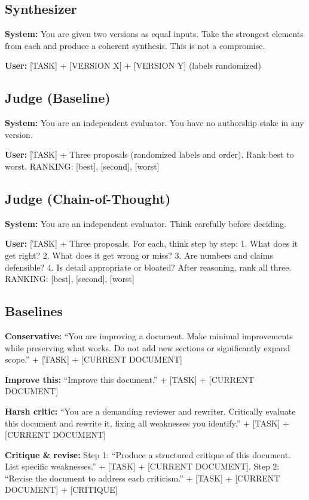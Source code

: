 \documentclass[11pt]{article}
\begin{document}
\subsection{Synthesizer}
\begin{tcolorbox}[promptbox]
\textbf{System:} You are given two versions as equal inputs. Take the strongest elements from each and produce a coherent synthesis. This is not a compromise.

\textbf{User:} [TASK] + [VERSION X] + [VERSION Y] (labels randomized)
\end{tcolorbox}

\subsection{Judge (Baseline)}
\begin{tcolorbox}[promptbox]
\textbf{System:} You are an independent evaluator. You have no authorship stake in any version.

\textbf{User:} [TASK] + Three proposals (randomized labels and order). Rank best to worst.
RANKING: [best], [second], [worst]
\end{tcolorbox}

\subsection{Judge (Chain-of-Thought)}
\begin{tcolorbox}[promptbox]
\textbf{System:} You are an independent evaluator. Think carefully before deciding.

\textbf{User:} [TASK] + Three proposals. For each, think step by step:
1. What does it get right?
2. What does it get wrong or miss?
3. Are numbers and claims defensible?
4. Is detail appropriate or bloated?
After reasoning, rank all three.
RANKING: [best], [second], [worst]
\end{tcolorbox}

\subsection{Baselines}
\begin{tcolorbox}[promptbox]
\textbf{Conservative:} ``You are improving a document. Make minimal improvements while preserving what works. Do not add new sections or significantly expand scope.'' + [TASK] + [CURRENT DOCUMENT]

\textbf{Improve this:} ``Improve this document.'' + [TASK] + [CURRENT DOCUMENT]

\textbf{Harsh critic:} ``You are a demanding reviewer and rewriter. Critically evaluate this document and rewrite it, fixing all weaknesses you identify.'' + [TASK] + [CURRENT DOCUMENT]

\textbf{Critique \& revise:} Step 1: ``Produce a structured critique of this document. List specific weaknesses.'' + [TASK] + [CURRENT DOCUMENT]. Step 2: ``Revise the document to address each criticism.'' + [TASK] + [CURRENT DOCUMENT] + [CRITIQUE]
\end{tcolorbox}
\end{document}
